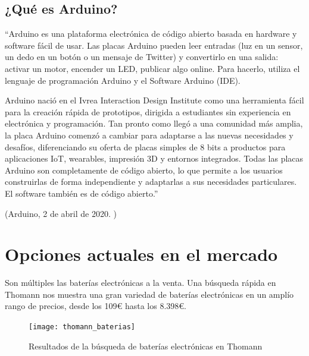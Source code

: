         \subsection{¿Qué es Arduino?} %
        \label{sub:QueEsArduino}

            ``Arduino es una plataforma electrónica de código abierto basada en hardware y software fácil de usar. Las
            placas Arduino pueden leer entradas (luz en un sensor, un dedo en un botón o un mensaje de Twitter) y
            convertirlo en una salida: activar un motor, encender un LED, publicar algo online. Para hacerlo, utiliza
            el lenguaje de programación Arduino y el Software Arduino (IDE).

            Arduino nació en el Ivrea Interaction Design Institute como una herramienta fácil para la creación rápida de
            prototipos, dirigida a estudiantes sin experiencia en electrónica y programación. Tan pronto como llegó a
            una comunidad más amplia, la placa Arduino comenzó a cambiar para adaptarse a las nuevas necesidades y
            desafíos, diferenciando su oferta de placas simples de 8 bits a productos para aplicaciones IoT, wearables,
            impresión 3D y entornos integrados. Todas las placas Arduino son completamente de código abierto, lo que
            permite a los usuarios construirlas de forma independiente y adaptarlas a sus necesidades particulares. El
            software también es de código abierto.''

            \begin{flushright}
                (Arduino, 2 de abril de 2020. \cite{arduino_introduction})
            \end{flushright}
        



    \section{Opciones actuales en el mercado} %
    \label{sec:OpcionesActualesEnElMercado}

        Son múltiples las baterías electrónicas a la venta. Una búsqueda rápida en Thomann\cite{thomann_baterias} nos
        muestra una gran variedad de baterías electrónicas en un amplío rango de precios, desde los 109\euro{} hasta los
        8.398\euro{}.

        \begin{figure}[ht]
            \centering
            \texttt{[image: thomann\_baterias]}
            \caption{Resultados de la búsqueda de baterías electrónicas en Thomann}
        \end{figure}

